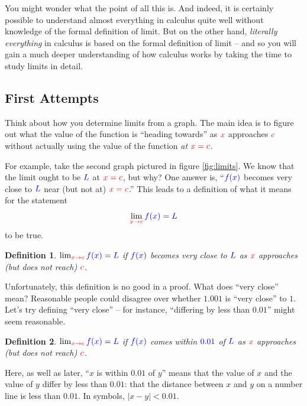 \documentclass{myarticle}
\newcommand{\hor}[1]{\textcolor{red}{#1}} %
\newcommand{\ver}[1]{\textcolor{blue}{#1}}
\theoremstyle{nospace}
\newtheorem*{oldattempt}{Definition}
\newenvironment{attempt}{\begin{mdframed}\begin{oldattempt}}{\end{oldattempt}\end{mdframed}}
\newtheorem{old series theorem}{Theorem}
\newenvironment{series theorem}{\begin{mdframed}\begin{old series theorem}}{\end{old series theorem}\end{mdframed}}
\begin{document}
You might wonder what the point of all this is. And indeed, it is certainly possible to understand almost everything in calculus quite well without knowledge of the formal definition of limit. But on the other hand, \emph{literally everything} in calculus is based on the formal definition of limit -- and so you will gain a much deeper understanding of how calculus works by taking the time to study limits in detail.

\subsection{First Attempts} \label{sec:first attempts}

Think about how you determine limits from a graph. The main idea is to figure out what the value of the function is ``heading towards'' as $\hor{x}$ approaches $\hor{c}$ without actually using the value of the function \emph{at} $\hor{x = c}$.

For example, take the second graph pictured in figure \ref{fig:limits}. We know that the limit ought to be $\ver{L}$ at $\hor{x = c}$, but why? One answer is, ``$\ver{f(x)}$ becomes very close to $\ver{L}$ near (but not at) $\hor{x = c}$.'' This leads to a definition of what it means for the statement \[ \lim_{\hor{x \to c}} \ver{f(x)} = \ver{L} \] to be true.

\begin{attempt} $\lim_{\hor{x \to c}} \ver{f(x)} = \ver{L}$ if $\ver{f(x)}$ becomes very close to $\ver{L}$ as $\hor{x}$ approaches (but does not reach) $\hor{c}$. \end{attempt}

Unfortunately, this definition is no good in a proof. What does ``very close'' mean? Reasonable people could disagree over whether $1.001$ is ``very close'' to $1$. Let's try defining ``very close'' -- for instance, ``differing by less than $0.01$'' might seem reasonable.

\begin{attempt} $\lim_{\hor{x \to c}} \ver{f(x)} = \ver{L}$ if $\ver{f(x)}$ comes within $\ver{0.01}$ of $\ver{L}$ as $\hor{x}$ approaches (but does not reach) $\hor{c}$. \end{attempt}

Here, as well as later, ``$x$ is within $0.01$ of $y$'' means that the value of $x$ and the value of $y$ differ by less than $0.01$: that the distance between $x$ and $y$ on a number line is less than $0.01$. In symbols, $|x - y| < 0.01$.
\end{document}
